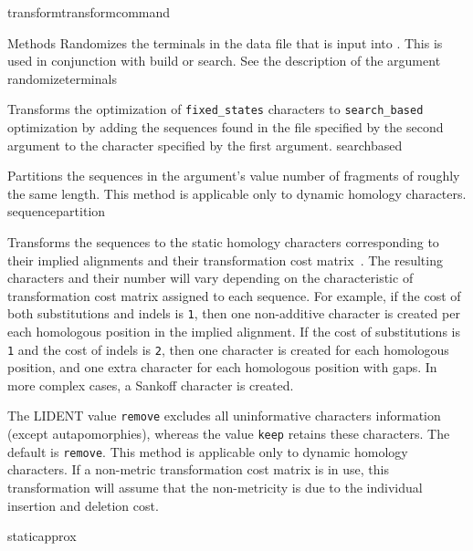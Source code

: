 \begin{command}{transform}{transformcommand}
\begin{arguments}
\begin{argumentgroup}{Methods}
        {Randomizes the terminals in the data file that is input into \poy.  This is used in conjunction with 
        build or search. See the description of the argument }
        {randomizeterminals}
        
        {Transforms the optimization of \texttt{fixed\_states} characters to \texttt{search\_based}
        optimization \cite{wheeler2003b} by adding the sequences found in the file specified by the second 
        argument to the character specified by the first argument.}
        {searchbased}
        
            {Partitions the sequences in the argument's value number of
            fragments of roughly the same length. This method is applicable only to dynamic homology characters.}
            {sequencepartition}

            {Transforms the sequences to the static homology characters
            corresponding to their implied alignments and their transformation
            cost matrix~\cite{wheeler2003}. The resulting characters and their number will vary
            depending on the characteristic of transformation cost matrix
            assigned to each sequence. For example, if the cost of both substitutions
            and indels is \texttt{1}, then one non-additive character is created per
            each homologous position in the implied alignment. If the cost of
            substitutions is \texttt{1} and the cost of indels  is \texttt{2}, then
            one character is created for each homologous position, and one extra character for
            each homologous position with gaps. In more complex cases, a Sankoff character is
            created.
            
            The LIDENT value \texttt{remove} excludes all uninformative characters
            information (except autapomorphies), whereas the value \texttt{keep}
            retains these characters. The default is \texttt{remove}. This
            method is applicable only to dynamic homology characters. If
            a non-metric transformation cost matrix is in use, this
            transformation will assume that the non-metricity is due to the
            individual insertion and deletion cost.}
            {staticapprox}
            

\end{argumentgroup}
\end{arguments}
\end{command}

